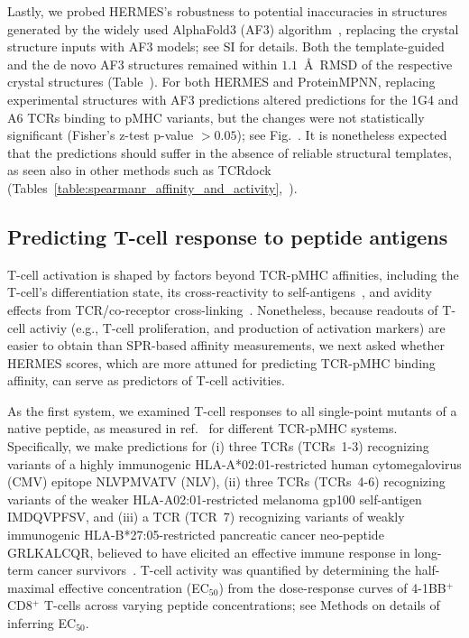 {Lastly, we probed HERMES's robustness to potential inaccuracies in structures generated by the
widely used AlphaFold3 (AF3) algorithm~\cite{Abramson2024-jp}, replacing the crystal structure
inputs with AF3 models; see SI for details.
Both the template-guided and the de novo AF3 structures remained within $1.1$~\AA\, RMSD of the
respective crystal structures (Table~\AfMetricsTable).
For both HERMES and ProteinMPNN, replacing experimental structures with AF3 predictions altered
predictions for the 1G4 and A6 TCRs binding to pMHC variants, but the changes were not statistically
significant (Fisher's z-test p-value $>0.05$); see Fig.~\AfScoringResultsFigure. It is nonetheless
expected that the predictions should suffer in the absence of reliable structural templates, as seen
also in other methods such as TCRdock~\cite{Bradley2023-rl}
(Tables~\ref{table:spearmanr_affinity_and_activity},~\SpearmanrAffinityTable). }
 
 
\subsection{\bf Predicting T-cell response to peptide antigens}
{T-cell activation is shaped by factors beyond TCR-pMHC affinities, including the T-cell's
differentiation state, its cross-reactivity to
self-antigens~\cite{Altan-Bonnet2005-lm,Achar2022-tb}, and avidity effects from TCR/co-receptor
cross-linking~\cite{Stone2009-ab}. Nonetheless, because readouts of T-cell activiy (e.g., T-cell
proliferation, and production of activation markers) are easier to obtain than SPR-based affinity
measurements, we next asked whether HERMES scores, which are more attuned for predicting TCR-pMHC
binding affinity, can serve as predictors of T-cell activities.}

As the first system, we examined T-cell responses to all single-point mutants of a native peptide,
as measured in ref.~\cite{Luksza2022-gx} for different TCR-pMHC systems. Specifically, we make
predictions for (i) three TCRs (TCRs~1-3) recognizing variants of a highly immunogenic
HLA-A*02:01-restricted human cytomegalovirus (CMV) epitope NLVPMVATV (NLV), (ii) three TCRs
(TCRs~4-6) recognizing variants of the {weaker} HLA-A02:01-restricted melanoma gp100 self-antigen
IMDQVPFSV, and (iii) a TCR (TCR~7) recognizing variants of weakly immunogenic HLA-B*27:05-restricted
pancreatic cancer neo-peptide GRLKALCQR, believed to have elicited an effective immune response in
long-term cancer survivors~\cite{Luksza2022-gx}. T-cell activity was quantified by determining the
half-maximal effective concentration (EC$_{50}$) from the dose-response curves of 4-1BB$^+$ CD8$^+$
T-cells across varying peptide concentrations; see Methods on details of inferring EC$_{50}$.

